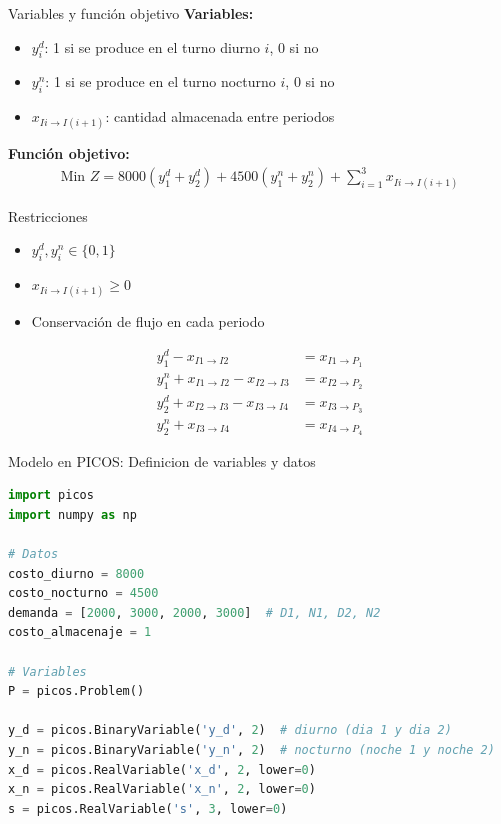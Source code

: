 \documentclass{beamer}
\begin{document}
\begin{frame}{Variables y función objetivo}
    \textbf{Variables:}
    \begin{itemize}
        \item $y^d_i$: 1 si se produce en el turno diurno $i$, 0 si no
        \item $y^n_i$: 1 si se produce en el turno nocturno $i$, 0 si no
        \item $x_{Ii \to I(i+1)}$: cantidad almacenada entre periodos
    \end{itemize}
    \vspace{0.5em}
    \textbf{Función objetivo:}
    \begin{align*}
        \text{Min } Z = 8000(y^d_1 + y^d_2) + 4500(y^n_1 + y^n_2) + \sum_{i=1}^{3} x_{Ii \to I(i+1)}
    \end{align*}
\end{frame}

\begin{frame}{Restricciones}
    \begin{itemize}
        \item $y^d_i, y^n_i \in \{0,1\}$
        \item $x_{Ii \to I(i+1)} \geq 0$
        \item Conservación de flujo en cada periodo
    \end{itemize}
    \begin{align*}
        y^d_1 - x_{I1 \to I2} &= x_{I1 \to P_1} \\
        y^n_1 + x_{I1 \to I2} - x_{I2 \to I3} &= x_{I2 \to P_2} \\
        y^d_2 + x_{I2 \to I3} - x_{I3 \to I4} &= x_{I3 \to P_3} \\
        y^n_2 + x_{I3 \to I4} &= x_{I4 \to P_4}
    \end{align*}
\end{frame}

\begin{frame}[fragile]{Modelo en PICOS: Definicion de variables y datos}
    \begin{lstlisting}[language=Python]
import picos
import numpy as np

# Datos
costo_diurno = 8000
costo_nocturno = 4500
demanda = [2000, 3000, 2000, 3000]  # D1, N1, D2, N2
costo_almacenaje = 1

# Variables
P = picos.Problem()

y_d = picos.BinaryVariable('y_d', 2)  # diurno (dia 1 y dia 2)
y_n = picos.BinaryVariable('y_n', 2)  # nocturno (noche 1 y noche 2)
x_d = picos.RealVariable('x_d', 2, lower=0)
x_n = picos.RealVariable('x_n', 2, lower=0)
s = picos.RealVariable('s', 3, lower=0)
    \end{lstlisting}
\end{frame}
\end{document}
